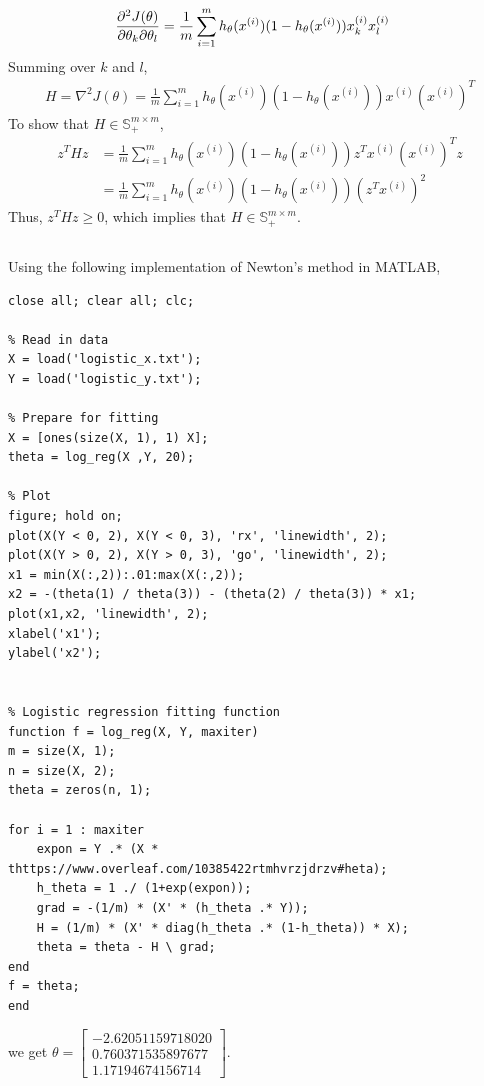 \documentclass[11pt,a4paper,titlepage]{article}
\begin{document}
{{\begin{align*}
	\pdv{J(\theta)}{\theta_k}{\theta_l} &= \frac{1}{m}\sum_{i=1}^{m} {h}_\theta(x^{(i)}) (1-{h}_\theta(x^{(i)})) x^{(i)}_k x^{(i)}_l
\end{align*}
Summing over $k$ and $l$,
\begin{align*}
	H = \nabla^2 J(\theta) = \frac{1}{m}\sum_{i=1}^{m} {h}_\theta(x^{(i)}) (1-{h}_\theta(x^{(i)})) x^{(i)}(x^{(i)})^T
\end{align*}
To show that $H\in\mathbb{S}^{m\times m}_+$,
\begin{align*}
	z^THz &= \frac{1}{m}\sum_{i=1}^{m} {h}_\theta(x^{(i)}) (1-{h}_\theta(x^{(i)})) z^Tx^{(i)}(x^{(i)})^Tz
    \\&= \frac{1}{m}\sum_{i=1}^{m} {h}_\theta(x^{(i)}) (1-{h}_\theta(x^{(i)})) (z^Tx^{(i)})^2
\end{align*}
Thus, $z^THz\geq0$, which implies that $H\in\mathbb{S}^{m\times m}_+$.
}\label{prob:1a}
\subsection{}{
\quad Using the following implementation of Newton's method in MATLAB, 
\begin{lstlisting}
close all; clear all; clc;

% Read in data
X = load('logistic_x.txt');
Y = load('logistic_y.txt');

% Prepare for fitting
X = [ones(size(X, 1), 1) X];
theta = log_reg(X ,Y, 20);

% Plot
figure; hold on;
plot(X(Y < 0, 2), X(Y < 0, 3), 'rx', 'linewidth', 2);
plot(X(Y > 0, 2), X(Y > 0, 3), 'go', 'linewidth', 2);
x1 = min(X(:,2)):.01:max(X(:,2));
x2 = -(theta(1) / theta(3)) - (theta(2) / theta(3)) * x1;
plot(x1,x2, 'linewidth', 2);
xlabel('x1');
ylabel('x2');


% Logistic regression fitting function
function f = log_reg(X, Y, maxiter)
m = size(X, 1);
n = size(X, 2);
theta = zeros(n, 1);

for i = 1 : maxiter
    expon = Y .* (X * thttps://www.overleaf.com/10385422rtmhvrzjdrzv#heta);
    h_theta = 1 ./ (1+exp(expon));
    grad = -(1/m) * (X' * (h_theta .* Y));
    H = (1/m) * (X' * diag(h_theta .* (1-h_theta)) * X);
    theta = theta - H \ grad;
end
f = theta;
end
\end{lstlisting}
we get $\theta=\begin{bmatrix}
				-2.62051159718020
                \\0.760371535897677
                \\ 1.17194674156714
				\end{bmatrix}$.
}\label{prob:1b}
}
\end{document}
